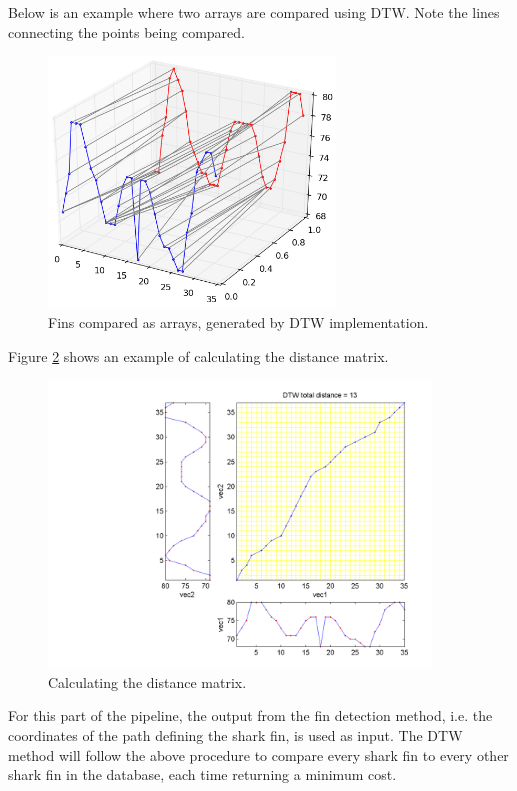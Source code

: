 \documentclass[a4paper,10pt]{article}
\begin{document}
Below is an example where two arrays are compared using DTW. Note the lines
connecting the points being compared.  

\begin{figure}[H]
 \centering
 \includegraphics[width=3in]{dtw.jpg}
 \caption{Fins compared as arrays, generated by DTW implementation.}
 \label{dtw}
\end{figure}

Figure \ref{dtw1} shows an example of calculating the distance matrix.

\begin{figure}[H]
 \centering
 \includegraphics[width=4in]{dtw1.png}
 \caption{Calculating the distance matrix\cite{dtw}.}
 \label{dtw1}
\end{figure}

For this part of the pipeline, the output from the fin detection method, i.e.
the coordinates of the path defining the shark fin, is used as input.  The DTW
method will follow the above procedure to compare every shark fin to every
other shark fin in the database, each time returning a minimum cost.  \\


\newpage
\end{document}
